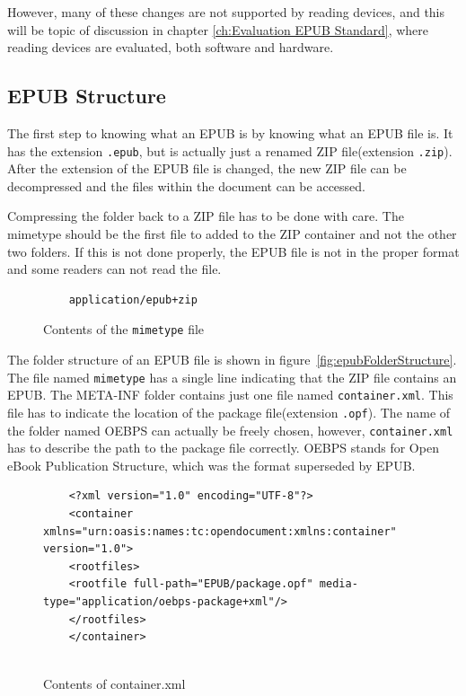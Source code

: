 However, many of these changes are not supported by reading devices, and this will be topic of discussion in chapter \ref{ch:Evaluation EPUB Standard}, where reading devices are evaluated, both software and hardware.\cite{EPUB30changes} 


\subsection{EPUB Structure}
The first step to knowing what an EPUB is by knowing what an EPUB file is. It has the extension \lstinline{.epub}, but is actually just a renamed ZIP file(extension \lstinline{.zip}). After the extension of the EPUB file is changed, the new ZIP file can be decompressed and the files within the document can be accessed.\cite{EPUB3bp}

Compressing the folder back to a ZIP file has to be done with care. The mimetype should be the first file to added to the ZIP container and not the other two folders. If this is not done properly, the EPUB file is not in the proper format and some readers can not read the file.


\begin{figure}
	\begin{lstlisting}
	application/epub+zip
	\end{lstlisting}
	\caption{Contents of the \lstinline{mimetype} file}
	\label{fig:mimetype}
\end{figure}

The folder structure of an EPUB file is shown in figure~\ref{fig:epubFolderStructure}. The file named \lstinline{mimetype} has a single line indicating that the ZIP file contains an EPUB. The META-INF folder contains just one file named \lstinline{container.xml}. This file has to indicate the location of the package file(extension \lstinline{.opf}). The name of the folder named OEBPS can actually be freely chosen, however, \lstinline{container.xml} has to describe the path to the package file correctly. OEBPS stands for Open eBook Publication Structure, which was the format superseded by EPUB.\cite{OPSspecs} 

\begin{figure}
	\begin{lstlisting}
	<?xml version="1.0" encoding="UTF-8"?>
	<container xmlns="urn:oasis:names:tc:opendocument:xmlns:container" version="1.0">
	<rootfiles>
	<rootfile full-path="EPUB/package.opf" media-type="application/oebps-package+xml"/>
	</rootfiles>
	</container>
	
	\end{lstlisting}
	\caption{Contents of container.xml}
	\label{fig:containerXML}
\end{figure}

